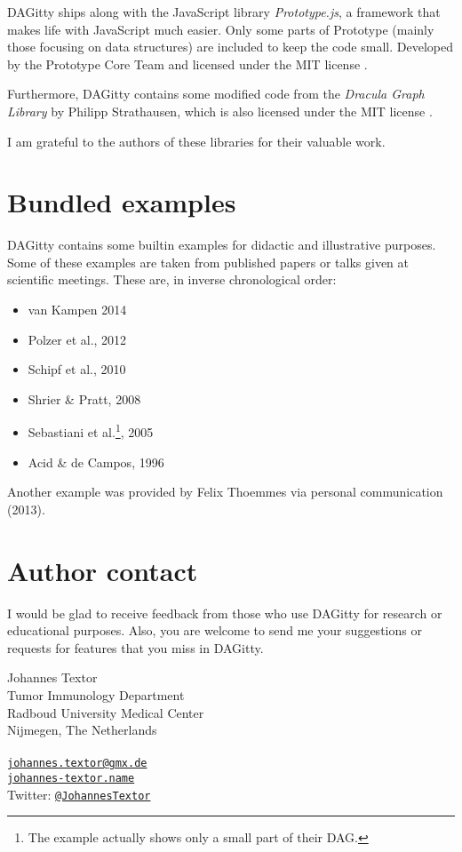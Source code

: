 \documentclass[a4paper]{article} %
\newcommand{\pp}{{\sc DAG}itty\xspace}
\begin{document}
\pp ships along with the JavaScript library \emph{Prototype.js}, 
a framework that makes life with JavaScript much easier. Only some 
  parts of Prototype (mainly those focusing on data structures) are included to keep the code small. Developed
  by the Prototype Core Team and licensed under the MIT license \cite{Prototype2010}. 

Furthermore, \pp contains some modified code from the \emph{Dracula Graph Library} by 
Philipp Strathausen, which is also licensed under the MIT license \cite{Dracula2010}. 

I am grateful to the authors of these libraries for their valuable work. 

\section{Bundled examples}

\pp contains some builtin examples for didactic and illustrative purposes. 
Some of these examples are taken from published papers or talks given at 
scientific meetings. These are, in inverse chronological order: 

\begin{itemize}
 \item van Kampen 2014 \cite{Kampen2014} 
 \item Polzer et al., 2012 \cite{Polzer2012}
 \item Schipf et al., 2010 \cite{Schipf2010}
 \item Shrier \& Pratt, 2008 \cite{ShrierP2008}
 \item Sebastiani et al.\footnote{The example actually shows only a small part of their DAG.}, 
    2005 \cite{Sebastiani2005}
 \item Acid \& de Campos, 1996 \cite{Acid1996}
\end{itemize}

Another example was provided by Felix Thoemmes 
via personal communication (2013).


\section{Author contact}

I would be glad to receive feedback from those 
who use \pp for research or educational purposes. 
Also, you are welcome to send me your 
suggestions or requests for features that 
you miss in \pp. 

\bigskip

\noindent
Johannes Textor \\
Tumor Immunology Department \\
Radboud University Medical Center \\
 Nijmegen, The Netherlands \\
\\
\href{mailto:johannes.textor@gmx.de}{\tt johannes.textor@gmx.de} \\
\href{http://johannes-textor.name}{\tt johannes-textor.name} \\
Twitter: \href{https://twitter.com/JohannesTextor}{\tt @JohannesTextor}

\bigskip



\end{document}
